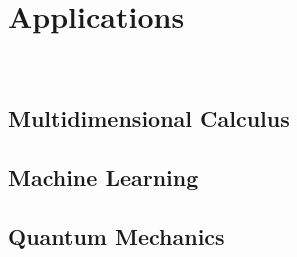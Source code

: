 \chapter{Applications}\
\section{Multidimensional Calculus}
\section{Machine Learning}
\section{Quantum Mechanics}